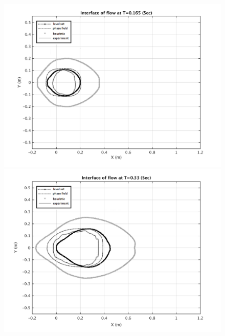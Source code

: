 \documentclass[letterpaper,10pt]{article}
\begin{document}
\begin{figure}[H]
        \begin{minipage}[b]{.48\linewidth}
                \centering
                \includegraphics[width=1\textwidth]{IMAGES/interface165exp.png}
                \includegraphics[width=1\textwidth]{IMAGES/interface330exp.png}
        \end{minipage}
        \begin{minipage}[b]{.48 \linewidth}
                \centering

\end{minipage}
\end{figure}
\end{document}
